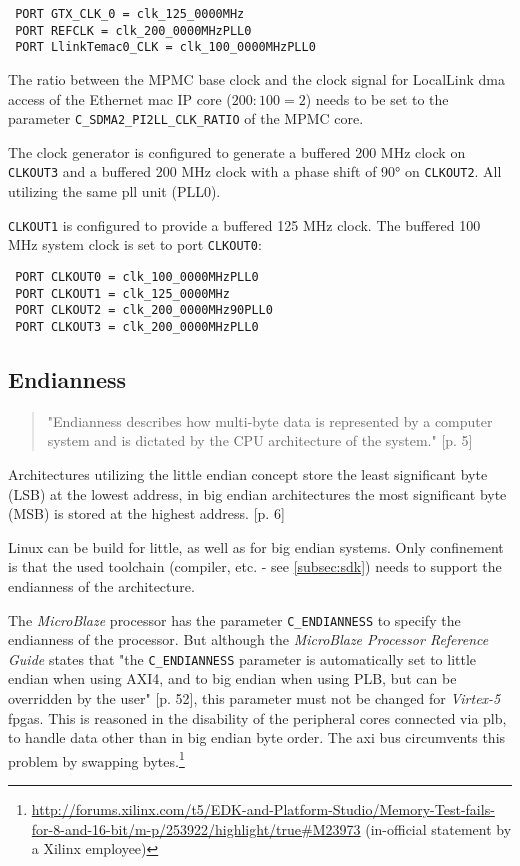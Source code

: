 \begin{verbatim}
 PORT GTX_CLK_0 = clk_125_0000MHz
 PORT REFCLK = clk_200_0000MHzPLL0
 PORT LlinkTemac0_CLK = clk_100_0000MHzPLL0
\end{verbatim}

The ratio between the MPMC base clock and the clock signal for LocalLink \gls{dma} access of the Ethernet \gls{mac} IP core ($200:100 = 2$) needs to be set to the parameter \texttt{C\_SDMA2\_PI2LL\_CLK\_RATIO} of the MPMC core.

The clock generator is configured to generate a buffered 200 MHz clock on \texttt{CLKOUT3} and a buffered 200 MHz clock with a phase shift of 90° on \texttt{CLKOUT2}. All utilizing the same \gls{pll} unit (PLL0).

\texttt{CLKOUT1} is configured to provide a buffered 125 MHz clock. The buffered 100 MHz system clock is set to port \texttt{CLKOUT0}:

\begin{verbatim}
 PORT CLKOUT0 = clk_100_0000MHzPLL0
 PORT CLKOUT1 = clk_125_0000MHz
 PORT CLKOUT2 = clk_200_0000MHz90PLL0
 PORT CLKOUT3 = clk_200_0000MHzPLL0
\end{verbatim}


\subsection{Endianness}

\begin{quote}
 "Endianness describes how multi-byte data is represented by a computer system and is dictated by the CPU architecture of the system." \cite{intel_endiannness}[p. 5]
\end{quote}

Architectures utilizing the little endian concept store the least significant byte (LSB) at the lowest address, in big endian architectures the most significant byte (MSB) is stored at the highest address. \cite{intel_endiannness}[p. 6]

Linux can be build for little, as well as for big endian systems. Only confinement is that the used toolchain (compiler, etc. - see \ref{subsec:sdk}) needs to support the endianness of the architecture.

The \textit{MicroBlaze} processor has the parameter \texttt{C\_ENDIANNESS} to specify the endianness of the processor. But although the \textit{MicroBlaze Processor Reference Guide} states that "the \texttt{C\_ENDIANNESS} parameter is automatically set to little endian when using AXI4, and to big endian when using PLB, but can be overridden by the user" \cite{mb_ref}[p. 52], this parameter must not be changed for \textit{Virtex-5} \gls{fpga}s. This is reasoned in the disability of the peripheral cores connected via \gls{plb}, to handle data other than in big endian byte order. The \gls{axi} bus circumvents this problem by swapping bytes.\footnote{\url{http://forums.xilinx.com/t5/EDK-and-Platform-Studio/Memory-Test-fails-for-8-and-16-bit/m-p/253922/highlight/true\#M23973} (in-official statement by a Xilinx employee)}

